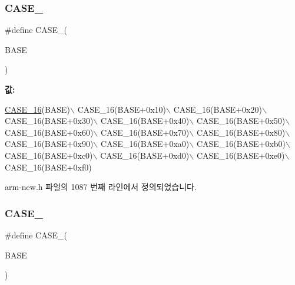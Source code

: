 \subsubsection{\texorpdfstring{C\+A\+S\+E\+\_}{CASE\_256}\hspace{0.1cm}{\footnotesize\ttfamily [1/2]}}
{\footnotesize\ttfamily \#define C\+A\+S\+E\+\_(\begin{DoxyParamCaption}\item[{}]{B\+A\+SE }\end{DoxyParamCaption})}

{\bfseries 값\+:}
\begin{DoxyCode}
\mbox{\hyperlink{arm-new_8h_a7dc7875774844a4717dfa1e8ecbc069c}{CASE\_16}}(BASE)\(\backslash\)
  CASE\_16(BASE+0x10)\(\backslash\)
  CASE\_16(BASE+0x20)\(\backslash\)
  CASE\_16(BASE+0x30)\(\backslash\)
  CASE\_16(BASE+0x40)\(\backslash\)
  CASE\_16(BASE+0x50)\(\backslash\)
  CASE\_16(BASE+0x60)\(\backslash\)
  CASE\_16(BASE+0x70)\(\backslash\)
  CASE\_16(BASE+0x80)\(\backslash\)
  CASE\_16(BASE+0x90)\(\backslash\)
  CASE\_16(BASE+0xa0)\(\backslash\)
  CASE\_16(BASE+0xb0)\(\backslash\)
  CASE\_16(BASE+0xc0)\(\backslash\)
  CASE\_16(BASE+0xd0)\(\backslash\)
  CASE\_16(BASE+0xe0)\(\backslash\)
  CASE\_16(BASE+0xf0)
\end{DoxyCode}


arm-\/new.\+h 파일의 1087 번째 라인에서 정의되었습니다.

\mbox{\label{_g_b_a_8cpp_a47d620846f3e6737dd5142ab2b9f726c}} 
\subsubsection{\texorpdfstring{C\+A\+S\+E\+\_}{CASE\_256}\hspace{0.1cm}{\footnotesize\ttfamily [2/2]}}
{\footnotesize\ttfamily \#define C\+A\+S\+E\+\_(\begin{DoxyParamCaption}\item[{}]{B\+A\+SE }\end{DoxyParamCaption})}

